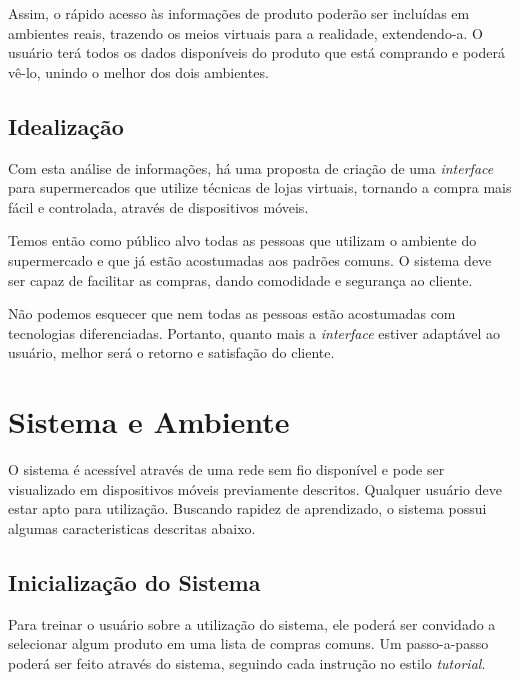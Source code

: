 \documentclass{article}
\begin{document}

Assim, o rápido acesso às informações de produto poderão ser incluídas em
ambientes reais, trazendo os meios virtuais para a realidade, extendendo-a. O
usuário terá todos os dados disponíveis do produto que está comprando e poderá
vê-lo, unindo o melhor dos dois ambientes.

\subsection{Idealização}


Com esta análise de informações, há uma proposta de criação de uma
\emph{interface} para supermercados que utilize técnicas de lojas virtuais,
tornando a compra mais fácil e controlada, através de dispositivos móveis.


Temos então como público alvo todas as pessoas que utilizam o ambiente do
supermercado e que já estão acostumadas aos padrões comuns. O sistema deve ser
capaz de facilitar as compras, dando comodidade e segurança ao cliente.


Não podemos esquecer que nem todas as pessoas estão acostumadas com tecnologias
diferenciadas. Portanto, quanto mais a \emph{interface} estiver adaptável ao
usuário, melhor será o retorno e satisfação do cliente.

\section{Sistema e Ambiente}


O sistema é acessível através de uma rede sem fio disponível e pode ser
visualizado em dispositivos móveis previamente descritos. Qualquer usuário deve
estar apto para utilização. Buscando rapidez de aprendizado, o sistema possui
algumas caracteristicas descritas abaixo.

\subsection{Inicialização do Sistema}


Para treinar o usuário sobre a utilização do sistema, ele poderá ser convidado a
selecionar algum produto em uma lista de compras comuns. Um passo-a-passo poderá
ser feito através do sistema, seguindo cada instrução no estilo \emph{tutorial}.
\end{document}
